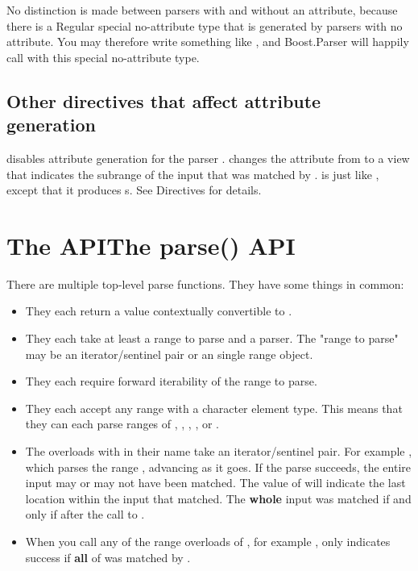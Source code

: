 \documentclass{MyBook}
\begin{document}
No distinction is made between parsers with and without an attribute, because there is a Regular special no-attribute type that is generated by parsers with no attribute. You may therefore write something like , and Boost.Parser will happily call  with this special no-attribute type.

\subsection{Other directives that affect attribute generation}

 disables attribute generation for the parser .  changes the attribute from \emph{} to a view that indicates the subrange of the input that was matched by .  is just like , except that it produces s. See Directives for details.

\section{{The  API}{The parse() API}}

There are multiple top-level parse functions. They have some things in common:

\begin{itemize}
\item
  They each return a value contextually convertible to .
\item
  They each take at least a range to parse and a parser. The "range to parse" may be an iterator/sentinel pair or an single range object.
\item
  They each require forward iterability of the range to parse.
\item
  They each accept any range with a character element type. This means that they can each parse ranges of , , , , or .
\item
  The overloads with  in their name take an iterator/sentinel pair. For example , which parses the range \ci{{[}first,\ last)}, advancing  as it goes. If the parse succeeds, the entire input may or may not have been matched. The value of  will indicate the last location within the input that  matched. The \textbf{whole} input was matched if and only if  after the call to .
\item
  When you call any of the range overloads of , for example ,  only indicates success if \textbf{all} of  was matched by .
\end{itemize}
\end{document}

